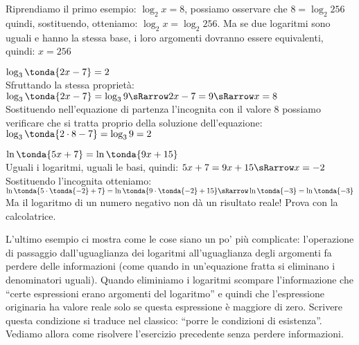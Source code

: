 \begin{esempio}
 Riprendiamo il primo esempio: \(\log_2{x} = 8\), possiamo osservare che 
 \(8 = \log_2{256}\) quindi, sostituendo, 
 otteniamo: \(\log_2{x} = \log_2{256}\). Ma se due logaritmi sono uguali e 
hanno la stessa base, i loro argomenti dovranno essere equivalenti, quindi:
\(x = 256\)
\end{esempio}

\begin{esempio}
 \(\log_{3}\tonda{2x-7} = 2 \)\\[4pt]
 Sfruttando la stessa proprietà: 
 \(\log_{3}\tonda{2x-7} = \log_{3}9 \sRarrow  
2x -7 = 9 \sRarrow x = 8\)
\\[4pt] 
Sostituendo nell'equazione di partenza l'incognita con il valore 8 
possiamo verificare che si tratta proprio della soluzione dell'equazione:
\(\log_{3}\tonda{2 \cdot 8-7} = \log_{3} 9 = 2\)
\end{esempio}

\begin{esempio}
 \(\ln\tonda{5x +7} = \ln\tonda{9x +15}\)
 \\[4pt]
 Uguali i logaritmi, uguali le basi, quindi:
 \(5x +7 = 9x +15  \sRarrow x = -2\)
 \\[4pt]
Sostituendo l'incognita otteniamo:
 \(\ln\tonda{5 \cdot \tonda{-2} +7} = 
   \ln\tonda{9 \cdot \tonda{-2} +15} \sRarrow 
   \ln\tonda{-3} = \ln\tonda{-3}\)
   \\[4pt]
 Ma il logaritmo di un numero negativo non dà un risultato reale! Prova con 
la calcolatrice.
\end{esempio}

L'ultimo esempio ci mostra come le cose siano un po' più complicate: 
l'operazione di passaggio dall'uguaglianza dei logaritmi all'uguaglianza 
degli 
argomenti fa perdere delle informazioni (come quando in un'equazione fratta 
si 
eliminano i denominatori uguali). 
Quando eliminiamo i logaritmi scompare l'informazione che ``certe 
espressioni 
erano argomenti del logaritmo'' e quindi che l'espressione originaria ha 
valore 
reale solo se questa espressione è maggiore di zero. 
Scrivere questa condizione si traduce nel classico: ``porre le condizioni 
di esistenza''.
Vediamo allora come risolvere l'esercizio precedente senza perdere 
informazioni.

